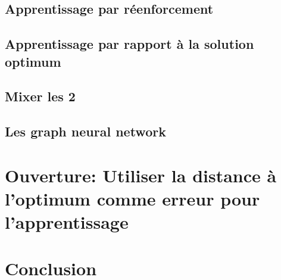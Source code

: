 \documentclass[letterpaper]{article}
\begin{document}
\begin{multicols}{2}
\subsection{Apprentissage par réenforcement}

\subsection{Apprentissage par rapport à la solution optimum}

\subsection{Mixer les 2}

\subsection{Les graph neural network}

\section{Ouverture: Utiliser la distance à l'optimum comme erreur pour l'apprentissage}

\section{Conclusion}

\end{multicols}
\end{document}
